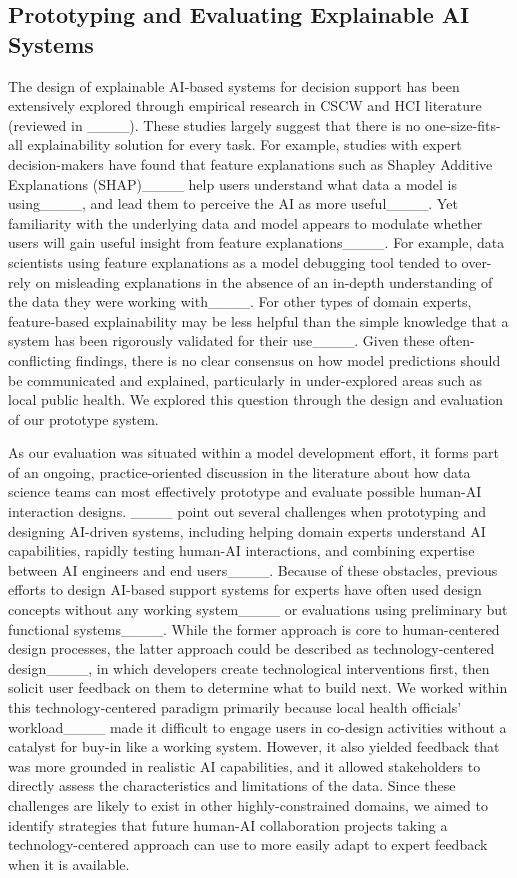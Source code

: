 \subsection{Prototyping and Evaluating Explainable AI Systems}

The design of explainable AI-based systems for decision support has been extensively explored through empirical research in CSCW and HCI literature (reviewed in ____).
These studies largely suggest that there is no one-size-fits-all explainability solution for every task.
For example, studies with expert decision-makers have found that feature explanations such as Shapley Additive Explanations (SHAP)____ help users understand what data a model is using____, and lead them to perceive the AI as more useful____.
Yet familiarity with the underlying data and model appears to modulate whether users will gain useful insight from feature explanations____.
For example, data scientists using feature explanations as a model debugging tool tended to over-rely on misleading explanations in the absence of an in-depth understanding of the data they were working with____.
For other types of domain experts, feature-based explainability may be less helpful than the simple knowledge that a system has been rigorously validated for their use____.
Given these often-conflicting findings, there is no clear consensus on how model predictions should be communicated and explained, particularly in under-explored areas such as local public health.
We explored this question through the design and evaluation of our prototype system.

As our evaluation was situated within a model development effort, it forms part of an ongoing, practice-oriented discussion in the literature about how data science teams can most effectively prototype and evaluate possible human-AI interaction designs.
____ point out several challenges when prototyping and designing AI-driven systems, including helping domain experts understand AI capabilities, rapidly testing human-AI interactions, and combining expertise between AI engineers and end users____. 
Because of these obstacles, previous efforts to design AI-based support systems for experts have often used design concepts without any working system____ or evaluations using preliminary but functional systems____.
While the former approach is core to human-centered design processes, the latter approach could be described as technology-centered design____, in which developers create technological interventions first, then solicit user feedback on them to determine what to build next.
We worked within this technology-centered paradigm primarily because local health officials' workload____ made it difficult to engage users in co-design activities without a catalyst for buy-in like a working system. 
However, it also yielded feedback that was more grounded in realistic AI capabilities, and it allowed stakeholders to directly assess the characteristics and limitations of the data.
Since these challenges are likely to exist in other highly-constrained domains, we aimed to identify strategies that future human-AI collaboration projects taking a technology-centered approach can use to more easily adapt to expert feedback when it is available.